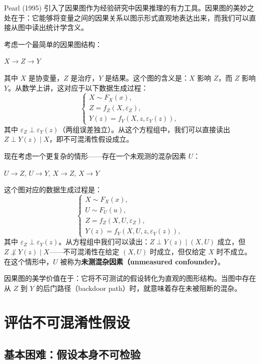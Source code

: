 Pearl (1995) 引入了因果图作为经验研究中因果推理的有力工具。因果图的美妙之处在于：它能够将变量之间的因果关系以图示形式直观地表达出来，而我们可以直接从图中读出统计学含义。

考虑一个最简单的因果图结构：

\begin{center}
$X \to Z \to Y$
\end{center}

其中 $X$ 是协变量，$Z$ 是治疗，$Y$ 是结果。这个图的含义是：$X$ 影响 $Z$，而 $Z$ 影响 $Y$。从数学上讲，这对应于以下数据生成过程：
\[
\begin{cases}
X \sim F_X(x), \\
Z = f_Z(X, \varepsilon_Z), \\
Y(z) = f_Y(X, z, \varepsilon_Y(z)),
\end{cases}
\tag{16.2}
\label{eq:16-dgp-simple}
\]
其中 $\varepsilon_Z \perp \varepsilon_Y(z)$（两组误差独立）。从这个方程组中，我们可以直接读出 $Z \perp Y(z) \mid X$，即不可混淆性假设成立。

现在考虑一个更复杂的情形——存在一个未观测的混杂因素 $U$：

\begin{center}
$U \to Z$, $U \to Y$, $X \to Z$, $X \to Y$
\end{center}

这个图对应的数据生成过程是：
\[
\begin{cases}
X \sim F_X(x), \\
U \sim F_U(u), \\
Z = f_Z(X, U, \varepsilon_Z), \\
Y(z) = f_Y(X, U, z, \varepsilon_Y(z)),
\end{cases}
\tag{16.3}
\label{eq:16-dgp-with-U}
\]
其中 $\varepsilon_Z \perp \varepsilon_Y(z)$。从方程组中我们可以读出：$Z \perp Y(z) \mid (X, U)$ 成立，但 $Z \not\perp Y(z) \mid X$——不可混淆性在给定 $(X, U)$ 时成立，但仅给定 $X$ 时不成立。在这个情形中，$U$ 被称为\textbf{未测混杂因素（unmeasured confounder）}。

因果图的美学价值在于：它将不可测试的假设转化为直观的图形结构。当图中存在从 $Z$ 到 $Y$ 的后门路径（backdoor path）时，就意味着存在未被阻断的混杂。

\section{评估不可混淆性假设}\label{sec:16-assessing-unconfoundedness}

\subsection{基本困难：假设本身不可检验}\label{sec:16-untestable}

